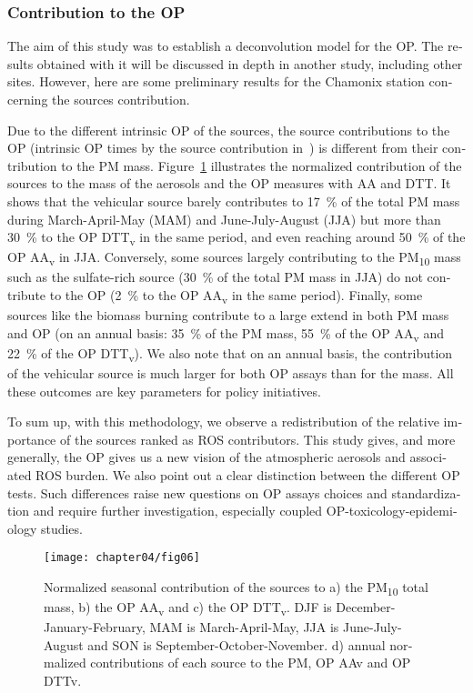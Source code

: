 \begin{otherlanguage}{english}
\subsubsection{Contribution to the OP}\label{contribution-to-the-op}

The aim of this study was to establish a deconvolution model for the OP. The
results obtained with it will be discussed in depth in another study, including
other sites. However, here are some preliminary results for the Chamonix
station concerning the sources contribution.

Due to the different intrinsic OP of the sources, the source contributions to
the OP (intrinsic OP times by the source contribution in~\si{\ugm}) is
different from their contribution to the PM mass.
Figure~\ref{fig:contributions} illustrates the normalized contribution of the
sources to the mass of the aerosols and the OP measures with AA and DTT. It
shows that the vehicular source barely contributes to 17~\% of the total PM mass
during March-April-May (MAM) and June-July-August (JJA) but more than 30~\% to
the OP DTT\textsubscript{v} in the same period, and even reaching around 50~\%
of the OP AA\textsubscript{v} in JJA. Conversely, some sources largely
contributing to the PM\textsubscript{10} mass such as the sulfate-rich source
(30~\% of the total PM mass in JJA) do not contribute to the OP (2~\% to the OP
AA\textsubscript{v} in the same period). Finally, some sources like the biomass
burning contribute to a large extend in both PM mass and OP (on an annual basis:
35~\% of the PM mass, 55~\% of the OP AA\textsubscript{v} and 22~\% of the OP
DTT\textsubscript{v}). We also note that on an annual basis, the contribution of
the vehicular source is much larger for both OP assays than for the mass.  All
these outcomes are key parameters for policy initiatives.

To sum up, with this methodology, we observe a redistribution of the relative
importance of the sources ranked as ROS contributors. This study gives, and more
generally, the OP gives us a new vision of the atmospheric aerosols and
associated ROS burden. We also point out a clear distinction between the
different OP tests. Such differences raise new questions on OP assays choices
and standardization and require further investigation, especially coupled
OP-toxicology-epidemiology studies.

\begin{figure}[ht]
    \centering
    \texttt{[image: chapter04/fig06]}
    \caption{Normalized seasonal contribution of the sources to a) the
    PM\textsubscript{10} total mass, b) the OP AA\textsubscript{v} and c) the OP
    DTT\textsubscript{v}. DJF is December-January-February, MAM is March-April-May,
JJA is June-July-August and SON is September-October-November. d) annual
normalized contributions of each source to the PM, OP AAv and OP DTTv.}
    \label{fig:contributions}
\end{figure}


\end{otherlanguage}
